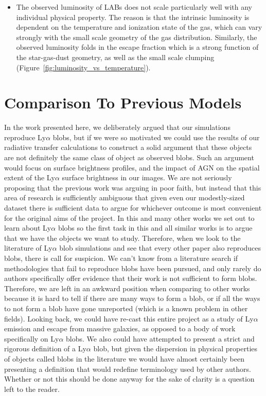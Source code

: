 \begin{itemize}
    \item The observed luminosity of LABs does not scale particularly well with any individual physical property.  The reason is that the intrinsic luminosity is dependent on the temperature and ionization state of the gas, which can vary strongly with the small scale geometry of the gas distribution.  Similarly, the observed luminosity folds in the escape fraction which is a strong function of the star-gas-dust geometry, as well as the small scale clumping  (Figure~\ref{fig:luminosity_vs_temperature}).
    
\end{itemize}


\section{Comparison To Previous Models}
In the work presented here, we deliberately argued that our simulations reproduce Ly$\alpha$ blobs, but if we were so motivated we could use the results of our radiative transfer calculations to construct a solid argument that these objects are not definitely the same class of object as observed blobs.
Such an argument would focus on surface brightness profiles, and the impact of AGN on the spatial extent of the Ly$\alpha$ surface brightness in our images.
We are not seriously proposing that the previous work was arguing in poor faith, but instead that this area of research is sufficiently ambiguous that given even our modestly-sized dataset there is sufficient data to argue for whichever outcome is most convenient for the original aims of the project.
In this and many other works we set out to learn about Ly$\alpha$ blobs so the first task in this and all similar works is to argue that we have the objects we want to study.
Therefore, when we look to the literature of Ly$\alpha$ blob simulations and see that every other paper also reproduces blobs, there is call for suspicion.
We can't know from a literature search if methodologies that fail to reproduce blobs have been pursued, and only rarely do authors specifically offer evidence that their work is not sufficient to form blobs.
Therefore, we are left in an awkward position when comparing to other works because it is hard to tell if there are many ways to form a blob, or if all the ways to not form a blob have gone unreported (which is a known problem in other fields).
Looking back, we could have re-cast this entire project as a study of Ly$\alpha$ emission and escape from massive galaxies, as opposed to a body of work specifically on Ly$\alpha$ blobs.
We also could have attempted to present a strict and rigorous definition of a Ly$\alpha$ blob, but given the dispersion in physical properties of objects called blobs in the literature we would have almost certainly been presenting a definition that would redefine terminology used by other authors.
Whether or not this should be done anyway for the sake of clarity is a question left to the reader.

